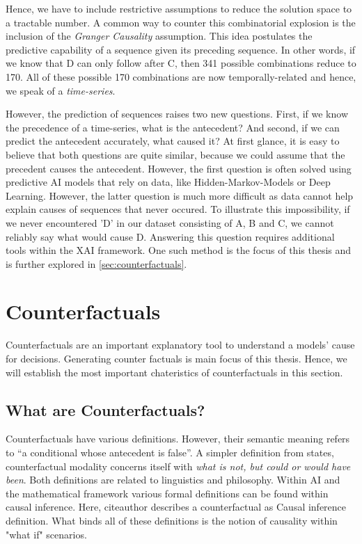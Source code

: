 \documentclass[12pt,a4paper]{report}
\begin{document}
Hence, we have to include restrictive assumptions to reduce the solution space to a tractable number. A common way to counter this combinatorial explosion is the inclusion of the \emph{Granger Causality} assumption. This idea postulates the predictive capability of a sequence given its preceding sequence. In other words, if we know that D can only follow after C, then 341 possible combinations reduce to 170. All of these possible 170 combinations are now temporally-related and hence, we speak of a \emph{time-series}.

However, the prediction of sequences raises two new questions. First, if we know the precedence of a time-series, what is the antecedent? And second, if we can predict the antecedent accurately, what caused it?
At first glance, it is easy to believe that both questions are quite similar, because we could assume that the precedent causes the antecedent. However,
the first question is often solved using predictive AI models that rely on data, like Hidden-Markov-Models or Deep Learning. However, the latter question is much more difficult as data cannot help explain causes of sequences that never occured. To illustrate this impossibility, if we never encountered 'D' in our dataset consisting of A, B and C, we cannot reliably say what would cause D. Answering this question requires additional tools within the \gls{XAI} framework. One such method is the focus of this thesis and is further explored in \autoref{sec:counterfactuals}.





\section{Counterfactuals}
\label{sec:counterfactuals}
Counterfactuals are an important explanatory tool to understand a models' cause for decisions. Generating counter factuals is main focus of this thesis. Hence, we will establish the most important chateristics of counterfactuals in this section.

\subsection{What are Counterfactuals?}
Counterfactuals have various definitions. However, their semantic meaning refers to \enquote{a conditional whose antecedent is false}\autocite{_Counterfactual_}. A simpler definition from \citeauthor{starr_Counterfactuals_2021} states, counterfactual modality concerns itself with \emph{what is not, but could or would have been}.
Both definitions are related to linguistics and philosophy. Within AI and the mathematical framework various formal definitions can be found within causal inference\autocite{hitchcock_CausalModels_2020}. Here, citeauthor describes a counterfactual as {Causal inference definition}. What binds all of these definitions is the notion of causality within "what if" scenarios.
\end{document}
